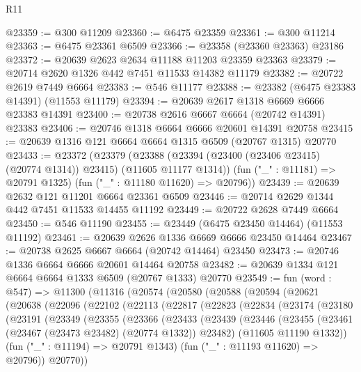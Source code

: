 \begin{lexlean}{R11}
\begin{coremodule}
@23359 := @300 @11209
@23360 := @6475 @23359
@23361 := @300 @11214
@23363 := @6475 @23361 @6509
@23366 := @23358 (@23360 @23363) @23186
@23372 := @20639 @2623 @2634 @11188 @11203 @23359 @23363
@23379 := @20714 @2620 @1326 @442 @7451 @11533 @14382 @11179
@23382 := @20722 @2619 @7449 @6664
@23383 := @546 @11177
@23388 := @23382 (@6475 @23383 @14391) (@11553 @11179)
@23394 := @20639 @2617 @1318 @6669 @6666 @23383 @14391
@23400 := @20738 @2616 @6667 @6664 (@20742 @14391) @23383
@23406 := @20746 @1318 @6664 @6666 @20601 @14391 @20758
@23415 := @20639 @1316 @121 @6664 @6664 @1315 @6509 (@20767 @1315) @20770
@23433 := @23372
    (@23379
      (@23388 (@23394 (@23400 (@23406 @23415) (@20774 @1314)) @23415) (@11605 @11177 @1314))
      (fun ("_" : @11181) => @20791 @1325)
      (fun ("_" : @11180 @11620) => @20796))
@23439 := @20639 @2632 @121 @11201 @6664 @23361 @6509
@23446 := @20714 @2629 @1344 @442 @7451 @11533 @14455 @11192
@23449 := @20722 @2628 @7449 @6664
@23450 := @546 @11190
@23455 := @23449 (@6475 @23450 @14464) (@11553 @11192)
@23461 := @20639 @2626 @1336 @6669 @6666 @23450 @14464
@23467 := @20738 @2625 @6667 @6664 (@20742 @14464) @23450
@23473 := @20746 @1336 @6664 @6666 @20601 @14464 @20758
@23482 := @20639 @1334 @121 @6664 @6664 @1333 @6509 (@20767 @1333) @20770
@23549 := fun (word : @547) =>
  @11300
    (@11316
      (@20574
        (@20580
          (@20588
            (@20594
              (@20621
                (@20638
                  (@22096
                    (@22102
                      (@22113
                        (@22817
                          (@22823
                            (@22834
                              (@23174
                                (@23180
                                  (@23191
                                    (@23349
                                      (@23355
                                        (@23366
                                          (@23433
                                            (@23439
                                              (@23446
                                                (@23455
                                                  (@23461
                                                    (@23467 (@23473 @23482) (@20774 @1332))
                                                    @23482)
                                                  (@11605 @11190 @1332))
                                                (fun ("_" : @11194) => @20791 @1343)
                                                (fun ("_" : @11193 @11620) => @20796))
                                              @20770))

\end{coremodule}
\end{lexlean}
